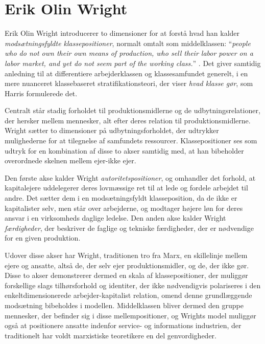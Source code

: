 \section{Erik Olin Wright \label{2_wright}}

Erik Olin Wright introducerer to dimensioner for at forstå hvad han kalder \emph{modsætningsfyldte klassepositioner}, normalt omtalt som middelklassen: “\emph{people who do not own their own means of production, who sell their labor power on a labor market, and yet do not seem part of the working class.}” \parencite[15]{Wright2000}. Det giver samtidig anledning til at differentiere arbejderklassen og klassesamfundet generelt, i en mere nuanceret klassebaseret stratifikationsteori, der viser \emph{hvad klasse gør}, som Harris formulerede det. 

Centralt står stadig forholdet til produktionsmidlerne og de udbytningsrelationer, der hersker mellem mennesker, alt efter deres relation til produktionsmidlerne. Wright sætter to dimensioner på udbytningsforholdet, der udtrykker mulighederne for at tilegnelse af samfundets ressourcer. Klassepositioner ses som udtryk for en kombination af disse to akser samtidig med, at han bibeholder overordnede skelnen mellem ejer-ikke ejer.

Den første akse kalder Wright \emph{autoritetspositioner}, og omhandler det forhold, at kapitalejere uddelegerer deres lovmæssige ret til at lede og fordele arbejdet til andre. Det sætter dem i en modsætningsfyldt klasseposition, da de ikke er kapitalister selv, men står over arbejderne, og modtager højere løn for deres ansvar i en virksomheds daglige ledelse. Den anden akse kalder Wright \emph{færdigheder}, der beskriver de faglige og tekniske færdigheder, der er nødvendige for en given produktion. 





Udover disse akser har Wright, traditionen tro fra Marx, en skillelinje mellem ejere og ansatte, altså de, der selv ejer produktionsmidler, og de, der ikke gør. Disse to akser demonstrerer dermed en skala af klassepositioner, der muliggør forskellige slags tilhørsforhold og identiter, der ikke nødvendigvis polariseres i den enkeltdimensionerede arbejder-kapitalist relation, omend denne grundlæggende modsætning bibeholdes i modellen. Middelklassen bliver dermed den gruppe mennesker, der befinder sig i disse mellempositioner, og Wrights model muliggør også at positionere ansatte indenfor service- og informations industrien, der traditionelt har voldt marxistiske teoretikere en del genvordigheder.

